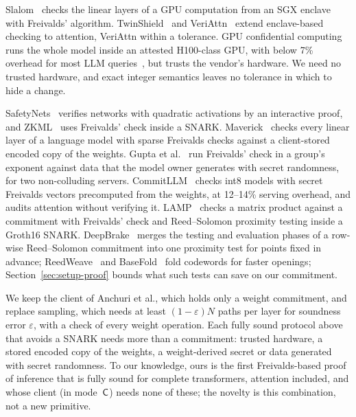  Slalom~\cite{slalom} checks the linear layers of a GPU computation from an
SGX enclave with Freivalds' algorithm. TwinShield~\cite{twinshield} and VeriAttn~\cite{veriattn}
extend enclave-based checking to attention, VeriAttn within a tolerance. GPU confidential computing
runs the whole model inside an attested H100-class GPU, with below 7\% overhead for most LLM
queries~\cite{gpucc}, but trusts the vendor's hardware. We need no trusted hardware, and exact integer semantics leaves no tolerance in which to hide a change.

 SafetyNets~\cite{safetynets} verifies networks
with quadratic activations by an interactive proof, and ZKML~\cite{zkml} uses Freivalds' check
inside a SNARK. Maverick~\cite{maverick} checks every linear layer of a language model with sparse
Freivalds checks against a client-stored encoded copy of the weights. Gupta et
al.~\cite{gupta2026private} run Freivalds' check in a group's exponent against data that the model
owner generates with secret randomness, for two non-colluding servers.
CommitLLM~\cite{commitllm2026} checks int8 models with secret Freivalds vectors precomputed from the
weights, at 12--14\% serving overhead, and audits attention without verifying it. LAMP~\cite{lamp}
checks a matrix product against a commitment with Freivalds' check and Reed--Solomon proximity
testing inside a Groth16 SNARK. DeepBrake~\cite{deepbrake} merges the testing and evaluation phases
of a row-wise Reed--Solomon commitment into one proximity test for points fixed in advance;
ReedWeave~\cite{reedweave} and BaseFold~\cite{basefold} fold codewords for faster openings;
Section~\ref{sec:setup-proof} bounds what such tests can save on our commitment.

 We keep the client of Anchuri et al., which holds only a weight commitment, and
replace sampling, which needs at least $(1-\varepsilon)N$ paths per layer for soundness error $\varepsilon$, with
a check of every weight operation. Each fully sound protocol above that avoids a SNARK needs more
than a commitment: trusted hardware, a stored encoded copy of the weights, a weight-derived secret
or data generated with secret randomness. To our knowledge, ours is the first Freivalds-based proof
of inference that is fully sound for complete transformers, attention included, and whose client
(in mode~$\mathsf{C}$) needs none of these; the novelty is this combination, not a new primitive.